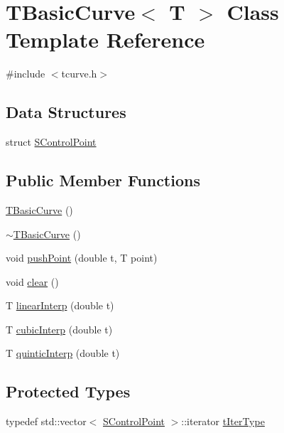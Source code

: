 \hypertarget{classTBasicCurve}{
\section{TBasicCurve$<$ T $>$ Class Template Reference}
\label{classTBasicCurve}
}


{\ttfamily \#include $<$tcurve.h$>$}\subsection*{Data Structures}
\begin{DoxyCompactItemize}
\item 
struct \hyperlink{structTBasicCurve_1_1SControlPoint}{SControlPoint}
\end{DoxyCompactItemize}
\subsection*{Public Member Functions}
\begin{DoxyCompactItemize}
\item 
\hyperlink{classTBasicCurve_ace94905798645e41acb2facd51403fb4}{TBasicCurve} ()
\item 
\hyperlink{classTBasicCurve_ab7d261b39efee8a494db4cca21e77810}{$\sim$TBasicCurve} ()
\item 
void \hyperlink{classTBasicCurve_add191aa03c62b7d8b3a99ac84926cefc}{pushPoint} (double t, T point)
\item 
void \hyperlink{classTBasicCurve_a0059da8249db22189e80382a2dc908b3}{clear} ()
\item 
T \hyperlink{classTBasicCurve_ad584a903021913723ff11c6eff6c4b0d}{linearInterp} (double t)
\item 
T \hyperlink{classTBasicCurve_ae76a13ad901a5bec94f5cc62731763eb}{cubicInterp} (double t)
\item 
T \hyperlink{classTBasicCurve_a1e76a2d45c4ff0bf074c28936efe359a}{quinticInterp} (double t)
\end{DoxyCompactItemize}
\subsection*{Protected Types}
\begin{DoxyCompactItemize}
\item 
typedef std::vector$<$ \hyperlink{structTBasicCurve_1_1SControlPoint}{SControlPoint} $>$::iterator \hyperlink{classTBasicCurve_a6a1c1b18090f60821279e8b76cff3a5c}{tIterType}
\end{DoxyCompactItemize}
